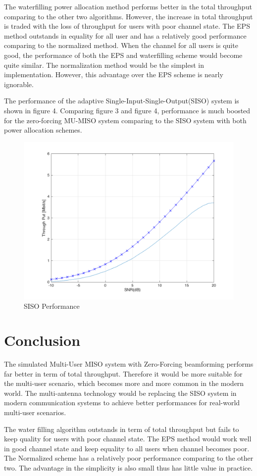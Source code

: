 \documentclass{article}
\begin{document}
\noindent
The waterfilling power allocation method performs better in the total throughput comparing to the other two algorithms.
However, the increase in total throughput is traded with the loss of throughput for users with poor channel state.
The EPS method outstands in equality for all user and has a relatively good performance comparing to the normalized method.
When the channel for all users is quite good, the performance of both the EPS and waterfilling scheme would become quite similar.
The normalization method would be the simplest in implementation. However, this advantage over the EPS scheme is nearly ignorable.

\noindent
The performance of the adaptive Single-Input-Single-Output(SISO) system is shown in figure 4. Comparing figure 3 and figure 4,
 performance is much boosted for the zero-forcing MU-MISO system comparing to the SISO system with both power allocation schemes.
\begin{figure}[ht]
\centering
\includegraphics[scale=0.25]{FadingSISO.png}
\caption{SISO Performance}
\label{fig:SISO}
\end{figure}


\section{Conclusion}
The simulated Multi-User MISO system with Zero-Forcing beamforming performs far better in term of total throughput. Therefore it would be
more suitable for the multi-user scenario, which becomes more and more common in the modern world.
The multi-antenna technology would be replacing the SISO system in modern communication systems to achieve better performances for
real-world multi-user scenarios.

\noindent
The water filling algorithm outstands in term of total throughput but fails to keep quality for users with poor channel state.
The EPS method would work well in good channel state and keep equality to all users when channel becomes poor.
The Normalized scheme has a relatively poor performance comparing to the other two. The advantage in the simplicity is also small thus has little value in practice.


{}
\end{document}
